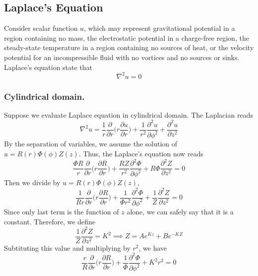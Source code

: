 \documentclass[../main.tex]{subfiles}
\begin{document}
\subsection*{Laplace's Equation}
Consider scalar function $u$, which may represent gravitational potential in a region containing no mass, the electrostatic potential in a charge-free region, the steady-state temperature in a region containing no sources of heat, or the velocity potential for an incompressible fluid with no vortices and no sources or sinks. Laplace's equation state that 
\begin{equation*}
    \nabla^2 u=0
\end{equation*}

\subsubsection*{Cylindrical domain.} Suppose we evaluate Laplace equation in cylindrical domain. The Laplacian reads
\begin{equation*}
    \nabla^2u= \frac{1}{r}\frac{\partial}{\partial r}\Biggl(r\frac{\partial u}{\partial r}\Biggr)+\frac{1}{r^2} \frac{\partial^2u}{\partial \phi^2}+ \frac{\partial^2u}{\partial z^2}
\end{equation*}
By the separation of variables, we assume the solution of $u=R(r)\Phi(\phi)Z(z)$. Thus, the Laplace's equation now reads
\begin{equation*}
    \frac{\Phi R}{r}\frac{\partial}{\partial r}\Biggl(r\frac{\partial R}{\partial r}\Biggr)
    +\frac{RZ}{r^2} \frac{\partial^2\Phi}{\partial \phi^2}
    + R\Phi\frac{\partial^2Z}{\partial z^2}=0
\end{equation*}
Then we divide by $u=R(r)\Phi(\phi)Z(z)$,
\begin{equation*}
    \frac{1}{Rr}\frac{\partial}{\partial r}\Biggl(r\frac{\partial R}{\partial r}\Biggr)
    +\frac{1}{\Phi r^2} \frac{\partial^2\Phi}{\partial \phi^2}
    + \frac{1}{Z}\frac{\partial^2Z}{\partial z^2}=0
\end{equation*}
Since only last term is the function of $z$ alone, we can safely say that it is a constant. Therefore, we define 
\begin{equation*}
    \frac{1}{Z}\frac{\partial^2Z}{\partial z^2}=K^2\implies Z=Ae^{Kz}+Be^{-KZ}
\end{equation*}
Subtituting this value and multiplying by $r^2$, we have
\begin{equation*}
    \frac{r}{R}\frac{\partial}{\partial r}\Biggl(r\frac{\partial R}{\partial r}\Biggr)
    +\frac{1}{\Phi } \frac{\partial^2\Phi}{\partial \phi^2}
    +K^2r^2=0
\end{equation*}
\end{document}
